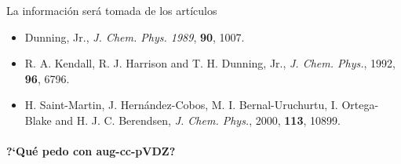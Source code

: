 La informaci\'on ser\'a tomada de los art\'iculos
\begin{itemize}
 \item Dunning, Jr., {\it J. Chem. Phys. 1989}, {\bf 90}, 1007.
 \item R. A. Kendall, R. J. Harrison and T. H. Dunning, Jr., {\it J.
 Chem. Phys.}, 1992, {\bf 96}, 6796.
 \item H. Saint-Martin, J. Hern\'andez-Cobos, M. I. Bernal-Uruchurtu,
 I. Ortega-Blake and H. J. C. Berendsen, {\it J. Chem. Phys.}, 2000,
 {\bf 113}, 10899.
\end{itemize}
\paragraph{?`Qu\'e pedo con aug-cc-pVDZ?}
